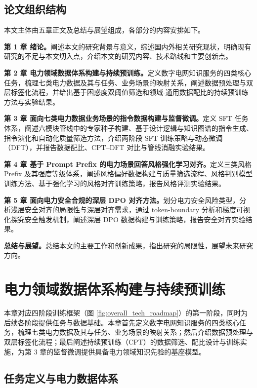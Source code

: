 \documentclass[fontset=fandol,type=master,campus=shenzhen,etitleauto=true]{hithesisbook}
\begin{document}
\section{论文组织结构}\label{ux8bbaux6587ux7ec4ux7ec7ux7ed3ux6784}

本文主体由五章正文及总结与展望组成，各部分的内容安排如下。

\textbf{第 1 章 绪论。}阐述本文的研究背景与意义，综述国内外相关研究现状，明确现有研究的不足与本文切入点，介绍本文的研究内容、技术路线和主要创新点。

\textbf{第 2 章 电力领域数据体系构建与持续预训练。}定义数字电网知识服务的四类核心任务，梳理七类电力数据及其与任务、业务场景的映射关系，阐述数据预处理与双层标签化流程，并给出基于困惑度双阈值筛选和领域-通用数据配比的持续预训练方法与实验结果。

\textbf{第 3 章 面向七类电力数据业务场景的指令数据构建与监督微调。}定义 SFT 任务体系，阐述六模块管线中的专家种子构建、基于设计逻辑与知识图谱的指令生成、指令演化和自动化质量筛选方法，介绍两阶段 SFT 训练策略与动态微调（DFT），并报告数据配比、CPT--DFT 对比与管线消融实验结果。

\textbf{第 4 章 基于 Prompt Prefix 的电力场景回答风格强化学习对齐。}定义三类风格 Prefix 及其强度等级体系，阐述风格偏好数据构建与质量筛选流程、风格判别模型训练方法、基于强化学习的风格对齐训练策略，报告风格评测实验结果。

\textbf{第 5 章 面向电力安全合规的深层 DPO 对齐方法。}划分电力安全风险类型，分析浅层安全对齐的局限性与深层对齐需求，通过 token-boundary 分析和梯度可视化探究安全触发机制，阐述深层 DPO 数据构建与训练策略，报告安全对齐实验结果。

\textbf{总结与展望。}总结本文的主要工作和创新成果，指出研究的局限性，展望未来研究方向。


\chapter{电力领域数据体系构建与持续预训练}\label{ux9762ux5411ux7535ux529bux77e5ux8bc6ux670dux52a1ux7684ux5927ux8bedux8a00ux6a21ux578bux603bux4f53ux6846ux67b6}

本章对应四阶段训练框架（图 \ref{fig:overall_tech_roadmap}）的第一阶段，同时为后续各阶段提供任务与数据基础。本章首先定义数字电网知识服务的四类核心任务，梳理七类电力数据及其与任务、业务场景的映射关系；然后介绍数据预处理与双层标签化流程；最后阐述持续预训练（CPT）的数据筛选、配比设计与训练实施，为第 3 章的监督微调提供具备电力领域知识先验的基座模型。

\section{任务定义与电力数据体系}\label{sec:task-data}
\end{document}
